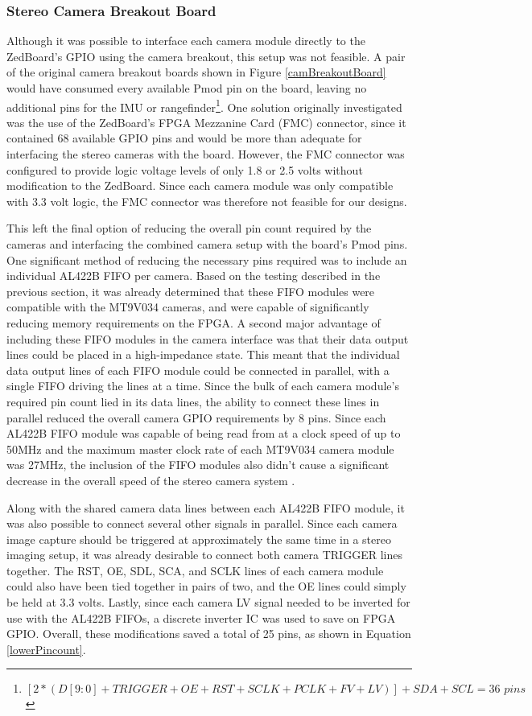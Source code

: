 \subsubsection{Stereo Camera Breakout Board}
Although it was possible to interface each camera module directly to the ZedBoard's GPIO using the camera breakout, this setup was not feasible. A pair of the original camera breakout boards shown in Figure \ref{camBreakoutBoard} would have consumed every available Pmod pin on the board, leaving no additional pins for the IMU or rangefinder\footnote{$[2*(D[9:0]+TRIGGER+OE+RST+SCLK+PCLK+FV+LV)]+SDA+SCL = 36\,\,pins$}. One solution originally investigated was the use of the ZedBoard's FPGA Mezzanine Card (FMC) connector, since it contained 68 available GPIO pins and would be more than adequate for interfacing the stereo cameras with the board. However, the FMC connector was configured to provide logic voltage levels of only 1.8 or 2.5 volts without modification to the ZedBoard. Since each camera module was only compatible with 3.3 volt logic, the FMC connector was therefore not feasible for our designs.
\par
This left the final option of reducing the overall pin count required by the cameras and interfacing the combined camera setup with the board's Pmod pins. One significant method of reducing the necessary pins required was to include an individual AL422B FIFO per camera. Based on the testing described in the previous section, it was already determined that these FIFO modules were compatible with the MT9V034 cameras, and were capable of significantly reducing memory requirements on the FPGA. A second major advantage of including these FIFO modules in the camera interface was that their data output lines could be placed in a high-impedance state. This meant that the individual data output lines of each FIFO module could be connected in parallel, with a single FIFO driving the lines at a time. Since the bulk of each camera module's required pin count lied in its data lines, the ability to connect these lines in parallel reduced the overall camera GPIO requirements by 8 pins. Since each AL422B FIFO module was capable of being read from at a clock speed of up to 50MHz and the maximum master clock rate of each MT9V034 camera module was 27MHz, the inclusion of the FIFO modules also didn't cause a significant decrease in the overall speed of the stereo camera system \cite{al422b,mt9v034}.
\par
Along with the shared camera data lines between each AL422B FIFO module, it was also possible to connect several other signals in parallel. Since each camera image capture should be triggered at approximately the same time in a stereo imaging setup, it was already desirable to connect both camera TRIGGER lines together. The RST, OE, SDL, SCA, and SCLK lines of each camera module could also have been tied together in pairs of two, and the OE lines could simply be held at 3.3 volts. Lastly, since each camera LV signal needed to be inverted for use with the AL422B FIFOs, a discrete inverter IC was used to save on FPGA GPIO. Overall, these modifications saved a total of 25 pins, as shown in Equation \ref{lowerPincount}.
